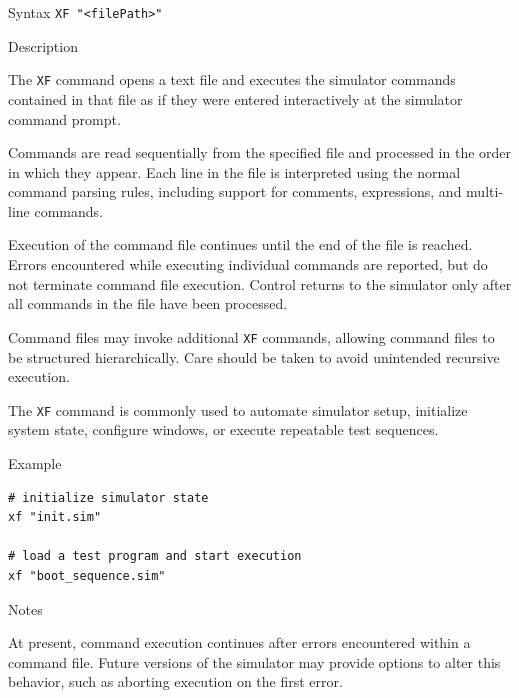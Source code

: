 %
%
\pagebreak
{}

\begin{iPageDescEntry}{Syntax}
\texttt{XF "<filePath>" } \\
\end{iPageDescEntry}

\begin{iPageDescEntry}{Description}

The \texttt{XF} command opens a text file and executes the simulator commands contained in that file as if they were entered interactively at the simulator command prompt.

Commands are read sequentially from the specified file and processed in the order in which they appear. Each line in the file is interpreted using the normal command parsing rules, including support for comments, expressions, and multi-line commands.

Execution of the command file continues until the end of the file is reached. Errors encountered while executing individual commands are reported, but do not terminate command file execution. Control returns to the simulator only after all commands in the file have been processed.

Command files may invoke additional \texttt{XF} commands, allowing command files to be structured hierarchically. Care should be taken to avoid unintended recursive execution.

The \texttt{XF} command is commonly used to automate simulator setup, initialize system state, configure windows, or execute repeatable test sequences.

\end{iPageDescEntry}


\begin{iPageDescOpEntry}{Example}
\begin{lstlisting}[style=iPageOpStyle]
# initialize simulator state
xf "init.sim"

# load a test program and start execution
xf "boot_sequence.sim"
\end{lstlisting}
\end{iPageDescOpEntry}

\begin{iPageDescEntry}{Notes}

At present, command execution continues after errors encountered within a command file. Future versions of the simulator may provide options to alter this behavior, such as aborting execution on the first error.

\end{iPageDescEntry}

